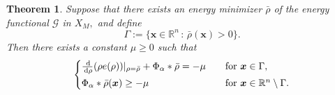 \documentclass[reqno,11pt]{amsart}
\numberwithin{equation}{section}
\newcommand{\R}{\mathbb{R}}
\newtheorem{theorem}{Theorem}[section]
\theoremstyle{definition}
\def\dd{{\, \rm d}}
\begin{document}
\begin{theorem}\label{lmul}
Suppose that there exists an energy minimizer $\bar{\rho}$ of the energy 
functional $\mathcal{G}$ in $X_M,$ and define
\[
 \Gamma:= \{ \boldsymbol{x} \in \mathbb{R}^n \, : \, \bar{\rho}(\boldsymbol{x}) > 0 \}.
\]
Then there exists a constant $\mu \geq 0$ such that
\begin{align}\label{station}
\begin{cases}
\frac{\dd}{\dd \rho}(\rho e(\rho))|_{\rho=\bar{\rho}}+\Phi_\alpha\ast\bar{\rho}= - \mu 
\quad & \mbox{for $\boldsymbol{x}\in \Gamma$},\\[1mm]
\Phi_\alpha\ast\bar{\rho}( \boldsymbol{x})\geq - \mu 
& \mbox{for $\boldsymbol{x}\in \R^n\setminus\Gamma$}.
\end{cases}
\end{align}
\end{theorem}
\end{document}
